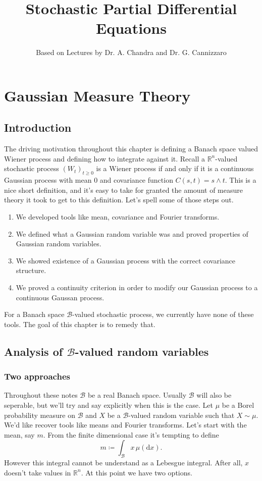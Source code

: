 \documentclass[fontsize=12pt, DIV=10]{scrreprt}
\title{Stochastic Partial Differential Equations}
\author{Based on Lectures by Dr. A. Chandra and Dr. G. Cannizzaro}
\theoremstyle{remark}
\newcommand{\defeq}{\coloneqq}
\newcommand{\R}{\mathbb R}
\newcommand{\calB}{\mathcal B}
\newcommand{\dif}[1]{\text{d} #1}
\begin{document}
\maketitle

\tableofcontents

\chapter{Gaussian Measure Theory}

\section{Introduction}

The driving motivation throughout this chapter is defining a Banach space valued Wiener process and defining how to integrate against it. Recall a $\R^n$-valued stochastic process $(W_t)_{t \geq 0}$ is a Wiener process if and only if it is a continuous Gaussian process with mean 0 and covariance function $C(s, t) = s \wedge t$. This is a nice short definition, and it's easy to take for granted the amount of measure theory it took to get to this definition. Let's spell some of those steps out.
\begin{enumerate}
	\item We developed tools like mean, covariance and Fourier transforms.
	\item We defined what a Gaussian random variable was and proved properties of Gaussian random variables.
	\item We showed existence of a Gaussian process with the correct covariance structure.
	\item We proved a continuity criterion in order to modify our Gaussian process to a continuous Gaussan process.
\end{enumerate}
For a Banach space $\calB$-valued stochastic process, we currently have none of these tools. The goal of this chapter is to remedy that.

\section{Analysis of $\calB$-valued random variables}

\subsection{Two approaches}

Throughout these notes $\calB$ be a real Banach space. Usually $\calB$ will also be seperable, but we'll try and say explicitly when this is the case. Let $\mu$ be a Borel probability measure on $\calB$ and $X$ be a $\calB$-valued random variable such that $X \sim \mu$. We'd like recover tools like means and Fourier transforms. Let's start with the mean, say $m$. From the finite dimensional case it's tempting to define
\begin{equation}
	m \defeq \int_{\calB} x \, \mu(\dif x).
\end{equation}
However this integral cannot be understand as a Lebesgue integral. After all, $x$ doesn't take values in $\R^n$. At this point we have two options.
\end{document}
